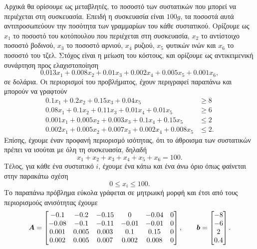 Αρχικά θα ορίσουμε ως μεταβλητές, το ποσοστό των συστατικών που μπορεί να
περιέχεται στη συσκευασία. Επειδή η συσκευασία είναι $100g$, τα ποσοστά
αυτά αντιπροσωπεύουν την ποσότητα των γραμμαρίων του κάθε συστατικού.
Ορίζουμε ως $x_1$ το ποσοστό του κοτόπουλου που περιέχεται στη
συσκευασία, $x_2$ το αντίστοιχο ποσοστό βοδινού, $x_3$ το ποσοστό
αρνιού, $x_4$ ρυζιού, $x_5$ φυτικών ινών και $x_6$ το ποσοστό
του τζελ. Στόχος είναι η μείωση του κόστους, και ορίζουμε ως
αντικειμενική συνάρτηση προς ελαχιστοποίηση
\begin{equation*}
    0.013x_1 + 0.008x_2 + 0.01x_3 + 0.002x_4 + 0.005x_5 + 0.001x_6,
\end{equation*}
σε δολάρια. Οι περιορισμοί του προβλήματος, έχουν περιγραφεί
παραπάνω και μπορούν να γραφτούν
\begin{align*}
    0.1x_1 + 0.2x_2 + 0.15x_3 + 0.04x_5 &\geq 8 \\
    0.08x_1 + 0.1x_2 + 0.11x_3 + 0.01x_4 + 0.01x_5 &\geq 6 \\
    0.001x_1 + 0.005x_2 + 0.003x_3 + 0.1x_4 + 0.15x_5 &\leq 2 \\
    0.002x_1 + 0.005x_2 + 0.007x_3 + 0.002x_4 + 0.008x_5 &\leq 2.
\end{align*}
Επίσης, έχουμε έναν προφανή περιορισμό ισότητας, ότι το
άθροισμα των συστατικών πρέπει να ισούται με όλη τη συσκευασία, δηλαδή
\begin{equation*}
    x_1 + x_2 + x_3 + x_4 + x_5 + x_6 = 100.
\end{equation*}
Τέλος, για κάθε ένα συστατικό $i$, έχουμε ένα κάτω και ένα
άνω όριο όπως φαίνεται στην παρακάτω σχέση
\begin{equation*}
    0 \leq x_i \leq 100.
\end{equation*}
Το παραπάνω πρόβλημα εύκολα γράφεται σε μητρωική μορφή και
έτσι από τους περιορισμούς ανισότητας έχουμε
\begin{equation*}
    \boldsymbol{A} =
    \begin{bmatrix}
        -0.1 & -0.2 & -0.15 & 0 & -0.04 & 0\\
        -0.08 & -0.1 & -0.11 & -0.01 & -0.01 & 0\\
        0.001 & 0.005 & 0.003 & 0.1 & 0.15 & 0\\
        0.002 & 0.005 & 0.007 & 0.002 & 0.008 & 0
    \end{bmatrix}, \qquad
    \bm{b} =
    \begin{bmatrix}
        -8\\ -6\\ 2\\ 0.4
    \end{bmatrix}.
\end{equation*}

